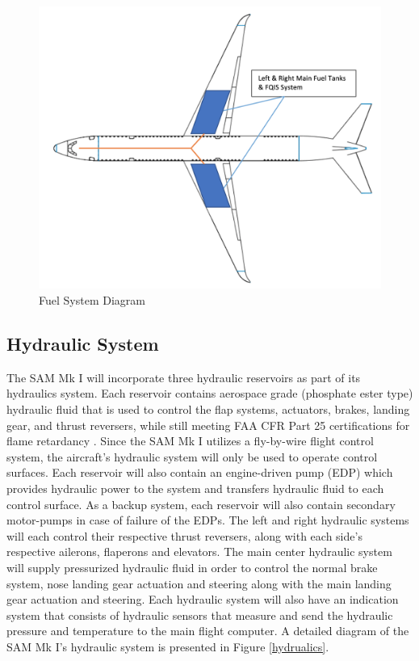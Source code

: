 \begin{figure}[H]
    \centering
    \includegraphics[width=.85\linewidth]{Photos/Fuel_tanks.png}
    \caption{Fuel System Diagram}
    \label{fuel_tank}
\end{figure}
 
\subsection{Hydraulic System}
The SAM Mk I will incorporate three hydraulic reservoirs as part of its hydraulics system. Each reservoir contains aerospace grade (phosphate ester type) hydraulic fluid that is used to control the flap systems, actuators, brakes, landing gear, and thrust reversers, while still meeting FAA CFR Part 25 certifications for flame retardancy \cite{cfr} . Since the SAM Mk I utilizes a fly-by-wire flight control system, the aircraft’s hydraulic system will only be used to operate control surfaces. Each reservoir will also contain an engine-driven pump (EDP) which provides hydraulic power to the system and transfers hydraulic fluid to each control surface. As a backup system, each reservoir will also contain secondary motor-pumps in case of failure of the EDPs. The left and right hydraulic systems will each control their respective thrust reversers, along with each side’s respective ailerons, flaperons and elevators. The main center hydraulic system will supply pressurized hydraulic fluid in order to control the normal brake system, nose landing gear actuation and steering along with the main landing gear actuation and steering. Each hydraulic system will also have an indication system that consists of hydraulic sensors that measure and send the hydraulic pressure and temperature to the main flight computer. A detailed diagram of the SAM Mk I’s hydraulic system is presented in Figure \ref{hydrualics}. 

